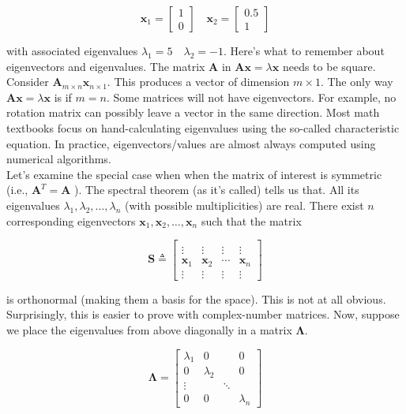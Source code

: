 \documentclass[main.tex]{subfiles}
\begin{document}
$$
\mathbf{x}_{1}=\left[\begin{array}{l}
1 \\
0
\end{array}\right] \quad \mathbf{x}_{2}=\left[\begin{array}{r}
0.5 \\
1
\end{array}\right]
$$

with associated eigenvalues $\lambda_{1}=5 \quad \lambda_{2}=-1$. Here's what to remember about eigenvectors and eigenvalues. The matrix $\mathbf{A}$ in $\mathbf{A x}=\lambda \mathbf{x}$ needs to be square. Consider $\mathbf{A}_{m \times n} \mathbf{x}_{n \times 1}$. This produces a vector of dimension $m \times 1$. The only way $\mathbf{A x}=\lambda \mathbf{x}$ is if $m=n$. Some matrices will not have eigenvectors. For example, no rotation matrix can possibly leave a vector in the same direction. Most math textbooks focus on hand-calculating eigenvalues using the so-called characteristic equation. In practice, eigenvectors/values are almost always computed using numerical algorithms. \\

Let's examine the special case when when the matrix of interest is symmetric (i.e., $\mathbf{A}^{T}=\mathbf{A}$ ). The spectral theorem (as it's called) tells us that. All its eigenvalues $\lambda_{1}, \lambda_{2}, \ldots, \lambda_{n}$ (with possible multiplicities) are real. There exist $n$ corresponding eigenvectors $\mathbf{x}_{1}, \mathbf{x}_{2}, \ldots, \mathbf{x}_{n}$ such that the matrix

$$
\mathbf{S} \triangleq\left[\begin{array}{cccc} 
& & & \\
\vdots & \vdots & \vdots & \vdots \\
\mathbf{x}_{1} & \mathbf{x}_{2} & \cdots & \mathbf{x}_{n} \\
\vdots & \vdots & \vdots & \vdots
\end{array}\right]
$$

is orthonormal (making them a basis for the space). This is not at all obvious. Surprisingly, this is easier to prove with complex-number matrices. Now, suppose we place the eigenvalues from above diagonally in a matrix $\boldsymbol{\Lambda}$.

$$
\boldsymbol{\Lambda}=\left[\begin{array}{cccc}
\lambda_{1} & 0 & & 0 \\
0 & \lambda_{2} & & 0 \\
\vdots & & \ddots & \\
0 & 0 & & \lambda_{n}
\end{array}\right]
$$
\end{document}
